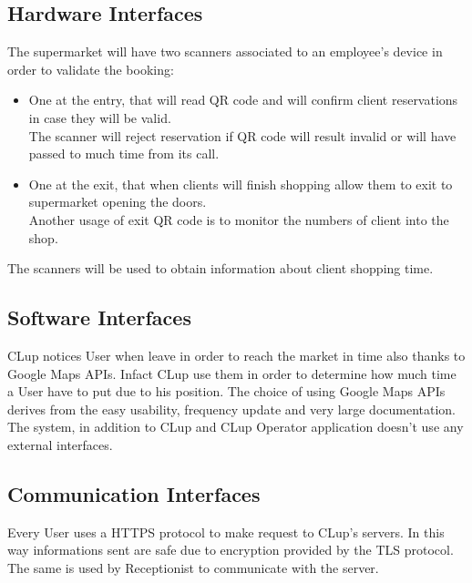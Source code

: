 \subsection{Hardware Interfaces}
The supermarket will have two scanners associated to an employee's device in order to validate the booking:

\par \medskip 
\begin{itemize}
\item One at the entry, that will read QR code and will confirm client reservations in case they will be valid. \\
The scanner will reject reservation if QR code will result invalid or will have passed to much time from its call.
\item One at the exit, that when clients will finish shopping allow them to exit to supermarket opening the doors. \\
Another usage of exit QR code is to monitor the numbers of client into the shop.
\end{itemize} 
\par \medskip 
The scanners will be used to obtain information about client shopping time.

\subsection{Software Interfaces}
CLup notices User when leave in order to reach the market in time also thanks to Google Maps APIs. Infact CLup use them in order to determine how much time a User have to put due to his position.
The choice of using Google Maps APIs derives from the easy usability, frequency update and very large documentation.
The system, in addition to CLup and CLup Operator application doesn't use any external interfaces.


\subsection{Communication Interfaces}
Every User uses a HTTPS protocol to make request to CLup's servers. In this way informations sent are safe due to encryption provided by the TLS protocol. The same is used by Receptionist to communicate with the server.

\pagebreak

